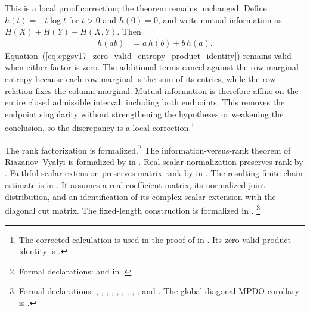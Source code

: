 \documentclass[11pt]{article}
\begin{document}
This is a local proof correction; the theorem remains unchanged. Define
$h(t)=-t\log t$ for $t>0$ and $h(0)=0$, and write mutual information as
$H(X)+H(Y)-H(X,Y)$. Then
\begin{align}
    h(ab)
        &= a\,h(b)+b\,h(a).
    \label{eq:cpgsv17_zero_valid_entropy_product_identity}
\end{align}
Equation~(\ref{eq:cpgsv17_zero_valid_entropy_product_identity}) remains valid
when either factor is zero. The additional terms cancel against the
row-marginal entropy because each row marginal is the sum of its entries,
while the row relation fixes the column marginal. Mutual information is
therefore affine on the entire closed admissible interval, including both
endpoints. This removes the endpoint singularity without strengthening the
hypotheses or weakening the conclusion, so the discrepancy is a local
correction.\footnote{The corrected calculation is used in the proof of
 in
. Its zero-valid product
identity is .}

The rank factorization is formalized.\footnote{Formal declarations:
 and
 in
.}
The information-versus-rank theorem of Riazanov--Vyalyi
\cite{Riazanov2017PSDRank} is formalized by
 in
. Real scalar normalization
preserves rank by . Faithful
scalar extension preserves matrix rank by
 in
. The resulting finite-chain
estimate
 is in
. It assumes a real coefficient
matrix, its normalized joint distribution, and an identification of its
complex scalar extension with the diagonal cut matrix. The fixed-length
construction is formalized in
.
\footnote{Formal declarations:
,
,
,
,
,
,
,
,
,
and
.
The global diagonal-MPDO corollary is
.}
\end{document}
